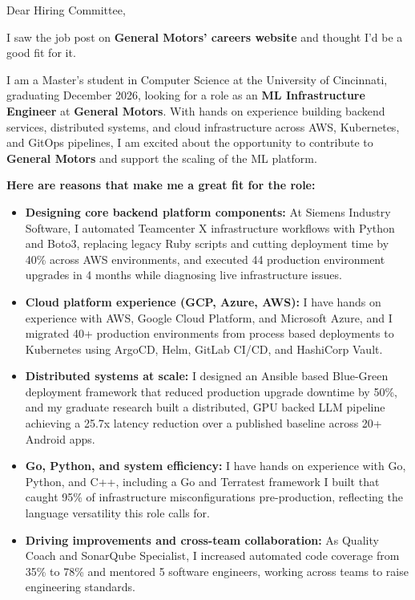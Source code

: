\documentclass[11pt]{letter}
\date{}
\begin{document}
\begin{letter}{}

\opening{Dear Hiring Committee,}

I saw the job post on \textbf{General Motors' careers website} and thought I'd be a good fit for it.

I am a Master's student in Computer Science at the University of Cincinnati, graduating December 2026, looking for a role as an \textbf{ML Infrastructure Engineer} at \textbf{General Motors}. With hands on experience building backend services, distributed systems, and cloud infrastructure across AWS, Kubernetes, and GitOps pipelines, I am excited about the opportunity to contribute to \textbf{General Motors} and support the scaling of the ML platform.

\textbf{Here are reasons that make me a great fit for the role:}

\begin{itemize}[leftmargin=*, itemsep=0.45em]
    \item \textbf{Designing core backend platform components:} At Siemens Industry Software, I automated Teamcenter X infrastructure workflows with Python and Boto3, replacing legacy Ruby scripts and cutting deployment time by 40\% across AWS environments, and executed 44 production environment upgrades in 4 months while diagnosing live infrastructure issues.

    \item \textbf{Cloud platform experience (GCP, Azure, AWS):} I have hands on experience with AWS, Google Cloud Platform, and Microsoft Azure, and I migrated 40+ production environments from process based deployments to Kubernetes using ArgoCD, Helm, GitLab CI/CD, and HashiCorp Vault.

    \item \textbf{Distributed systems at scale:} I designed an Ansible based Blue-Green deployment framework that reduced production upgrade downtime by 50\%, and my graduate research built a distributed, GPU backed LLM pipeline achieving a 25.7x latency reduction over a published baseline across 20+ Android apps.

    \item \textbf{Go, Python, and system efficiency:} I have hands on experience with Go, Python, and C++, including a Go and Terratest framework I built that caught 95\% of infrastructure misconfigurations pre-production, reflecting the language versatility this role calls for.

    \item \textbf{Driving improvements and cross-team collaboration:} As Quality Coach and SonarQube Specialist, I increased automated code coverage from 35\% to 78\% and mentored 5 software engineers, working across teams to raise engineering standards.
\end{itemize}


\end{letter}
\end{document}
